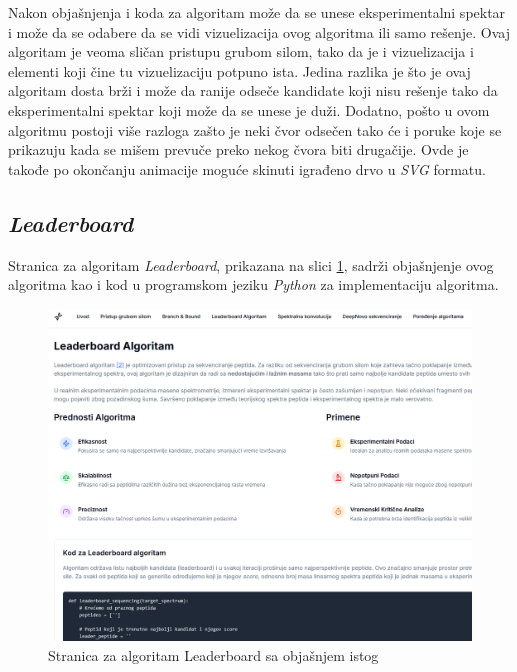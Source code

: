 \documentclass[12pt,oneside]{memoir}
\begin{document}
Nakon objašnjenja i koda za algoritam može da se unese eksperimentalni spektar i može da se odabere da se vidi vizuelizacija ovog algoritma ili samo rešenje. Ovaj algoritam je veoma sličan pristupu grubom silom, tako da je i vizuelizacija i elementi koji čine tu vizuelizaciju potpuno ista. Jedina razlika je što je ovaj algoritam dosta brži i može da ranije odseče kandidate koji nisu rešenje tako da eksperimentalni spektar koji može da se unese je duži. Dodatno, pošto u ovom algoritmu postoji više razloga zašto je neki čvor odsečen tako će i poruke koje se prikazuju kada se mišem prevuče preko nekog čvora biti drugačije. Ovde je takođe po okončanju animacije moguće skinuti igrađeno drvo u \emph{SVG} formatu.

\subsection{\emph{Leaderboard}}
Stranica za algoritam \emph{Leaderboard}, prikazana na slici \ref{fig:leaderboard_1}, sadrži objašnjenje ovog algoritma kao i kod u programskom jeziku \emph{Python} za implementaciju algoritma.
\begin{figure}[H]
\centering
\includegraphics[width=1\textwidth]{images/leaderboard_1.png}
\caption{Stranica za algoritam Leaderboard sa objašnjem istog}
\label{fig:leaderboard_1}
\end{figure}
\end{document}
